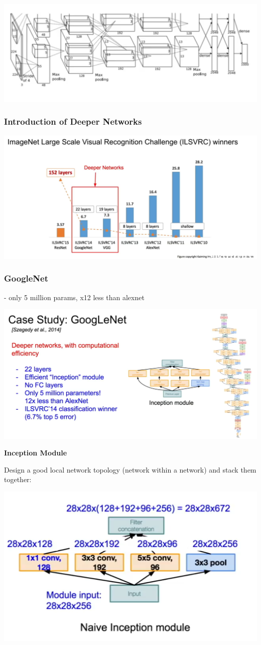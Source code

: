 \includegraphics[width=0.5\columnwidth]{fei_fei_li/lecture_09/alex_net.png}

\subsubsection{Introduction of Deeper Networks}
\includegraphics[width=0.5\columnwidth]{fei_fei_li/lecture_09/deeper_networks.png}

\subsubsection{GoogleNet}

- only 5 million params, x12 less than alexnet

\includegraphics[width=0.5\columnwidth]{fei_fei_li/lecture_09/google_net.png}

\textbf{Inception Module}

Design a good local network topology (network within a network) and stack them together:

\includegraphics[width=0.5\columnwidth]{fei_fei_li/lecture_09/naive.png}

